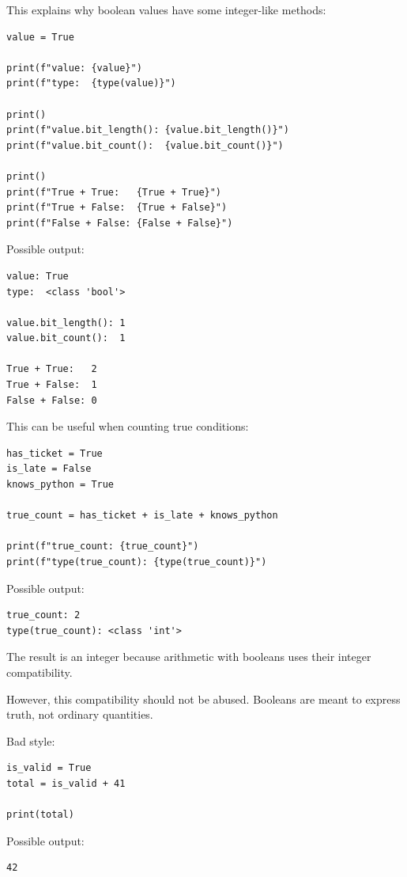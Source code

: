 This explains why boolean values have some integer-like methods:

\begin{verbatim}
value = True

print(f"value: {value}")
print(f"type:  {type(value)}")

print()
print(f"value.bit_length(): {value.bit_length()}")
print(f"value.bit_count():  {value.bit_count()}")

print()
print(f"True + True:   {True + True}")
print(f"True + False:  {True + False}")
print(f"False + False: {False + False}")
\end{verbatim}

Possible output:

\begin{verbatim}
value: True
type:  <class 'bool'>

value.bit_length(): 1
value.bit_count():  1

True + True:   2
True + False:  1
False + False: 0
\end{verbatim}

This can be useful when counting true conditions:

\begin{verbatim}
has_ticket = True
is_late = False
knows_python = True

true_count = has_ticket + is_late + knows_python

print(f"true_count: {true_count}")
print(f"type(true_count): {type(true_count)}")
\end{verbatim}

Possible output:

\begin{verbatim}
true_count: 2
type(true_count): <class 'int'>
\end{verbatim}

The result is an integer because arithmetic with booleans uses their integer compatibility.

However, this compatibility should not be abused. Booleans are meant to express truth, not ordinary quantities.

Bad style:

\begin{verbatim}
is_valid = True
total = is_valid + 41

print(total)
\end{verbatim}

Possible output:

\begin{verbatim}
42
\end{verbatim}

